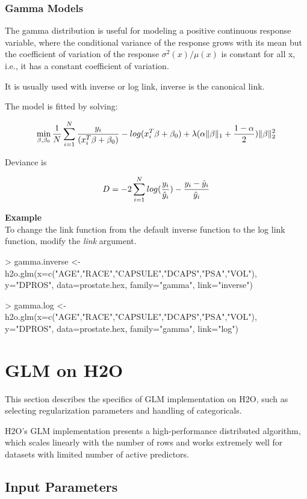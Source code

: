\documentclass[11pt]{article}
\begin{document}
\subsubsection{Gamma Models}
The gamma distribution is useful for modeling a positive continuous response variable, where the conditional variance of the response grows with its mean but  the coefficient of variation of the response $\sigma^2(x)/μ(x)$ is constant for all x,  i.e., it has a constant coefficient of variation.

It is usually used with inverse or log link, inverse is the canonical link.

The model is fitted by solving:

\[  \min\limits_{\beta,\beta_0} { {1 \over N}\sum\limits_{i=1}\limits^{N}{y_i \over (x_i^{T}\beta  + \beta_0)} - log({x_i^{T}\beta  + \beta_0})  + \lambda (\alpha \|\beta \|_1 + {1-\alpha \over 2}) \| \beta \|_2^2} \]

Deviance is 

\[D = -2\sum\limits_{i=1}\limits^{N}{log({y_i \over \hat{y}_i}) - {y_i - \hat{y}_i \over\hat{y}_i }}\]


\textbf{Example}\\
To change the link function from the default inverse function to the log link function, modify the \textit{link} argument.

\begin{spverbatim}
> gamma.inverse <- h2o.glm(x=c("AGE","RACE","CAPSULE","DCAPS","PSA","VOL"), y="DPROS", data=prostate.hex, family="gamma", link="inverse")

> gamma.log <- h2o.glm(x=c("AGE","RACE","CAPSULE","DCAPS","PSA","VOL"), y="DPROS", data=prostate.hex, family="gamma", link="log")
\end{spverbatim}



\section{GLM on H2O}
This section describes the specifics of GLM implementation on H2O, such as selecting regularization parameters and handling of categoricals. 

H2O's GLM implementation presents a high-performance distributed algorithm, which scales linearly with the number of rows and works extremely well for datasets with limited number of active predictors. 

\subsection{Input Parameters}
\end{document}
